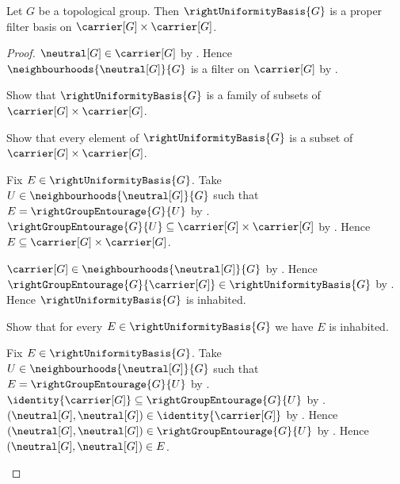 \begin{theorem}\label{right_uniformity_basis_is_proper_filter_basis}
    Let $G$ be a topological group.
    Then $\rightUniformityBasis{G}$ is a proper filter basis on
        $\carrier[G]\times\carrier[G]$.
\end{theorem}
\begin{proof}
    $\neutral[G]\in\carrier[G]$ by .
    Hence $\neighbourhoods{\neutral[G]}{G}$ is a filter on
        $\carrier[G]$ by .

    Show that $\rightUniformityBasis{G}$ is a family of subsets of
        $\carrier[G]\times\carrier[G]$.
    \begin{subproof}
        Show that every element of $\rightUniformityBasis{G}$ is a subset of
            $\carrier[G]\times\carrier[G]$.
        \begin{subproof}
        Fix $E\in\rightUniformityBasis{G}$.
        Take $U\in\neighbourhoods{\neutral[G]}{G}$ such that
            $E=\rightGroupEntourage{G}{U}$
            by .
        $\rightGroupEntourage{G}{U}
            \subseteq\carrier[G]\times\carrier[G]$
            by .
        Hence $E\subseteq\carrier[G]\times\carrier[G]$.
        \end{subproof}
    \end{subproof}

    $\carrier[G]\in\neighbourhoods{\neutral[G]}{G}$
        by .
    Hence $\rightGroupEntourage{G}{\carrier[G]}
        \in\rightUniformityBasis{G}$
        by .
    Hence $\rightUniformityBasis{G}$ is inhabited.

    Show that for every $E\in\rightUniformityBasis{G}$ we have
        $E$ is inhabited.
    \begin{subproof}
        Fix $E\in\rightUniformityBasis{G}$.
        Take $U\in\neighbourhoods{\neutral[G]}{G}$ such that
            $E=\rightGroupEntourage{G}{U}$ by
            .
        $\identity{\carrier[G]}
            \subseteq\rightGroupEntourage{G}{U}$
            by .
        $(\neutral[G],\neutral[G])
            \in\identity{\carrier[G]}$ by .
        Hence $(\neutral[G],\neutral[G])
            \in\rightGroupEntourage{G}{U}$ by .
        Hence $(\neutral[G],\neutral[G])\in E$.
    \end{subproof}


\end{proof}
